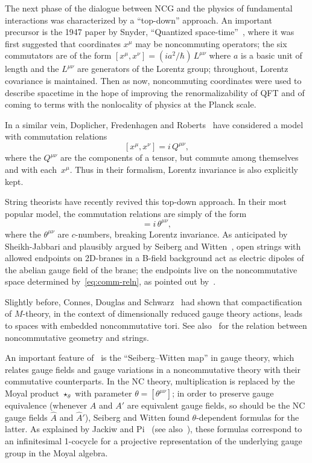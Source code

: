 \documentclass[a4paper,12pt]{article}
\makeatletter
\newcommand{\Ahat}{\Hat{A}}
\renewcommand{\Hat}[1]{\widehat{#1}}  %
\newcommand{\1}{\mathbf{1}}         %
\newcommand{\7}{\dagger}            %
\newcommand{\8}{\bullet}            %
\renewcommand{\.}{\cdot}            %
\renewcommand{\:}{\colon}           %
\def\section{\@startsection{section}{1}{\z@}{-3.5ex plus -1ex minus
 -.2ex}{2.3ex plus .2ex}{\large\bf}}
\makeatother
\begin{document}
\section{Noncommutative field theory}

The next phase of the dialogue between NCG and the physics of
fundamental interactions was characterized by a ``top-down'' approach.
An important precursor is the 1947 paper by Snyder, ``Quantized
space-time''~\cite{Snyder}, where it was first suggested that
coordinates $x^\mu$ may be noncommuting operators; the six commutators
are of the form $[x^\mu,x^\nu] = (ia^2/\hbar)\,L^{\mu\nu}$ where $a$
is a basic unit of length and the $L^{\mu\nu}$ are generators of the
Lorentz group; throughout, Lorentz covariance is maintained. Then as
now, noncommuting coordinates were used to describe spacetime in the
hope of improving the renormalizability of QFT and of coming to terms
with the nonlocality of physics at the Planck scale.

In a similar vein, Doplicher, Fredenhagen and
Roberts~\cite{DoplicherFR} have considered a model with commutation
relations
$$
[x^\mu, x^\nu] = i\, Q^{\mu\nu},
$$
where the $Q^{\mu\nu}$ are the components of a tensor, but commute
among themselves and with each~$x^\mu$. Thus in their formalism,
Lorentz invariance is also explicitly kept.

String theorists have recently revived this top-down approach. In
their most popular model, the commutation relations are simply of the
form
\begin{equation}
[x^\mu, x^\nu] = i\, \theta^{\mu\nu},
\label{eq:comm-reln}
\end{equation}
where the $\theta^{\mu\nu}$ are $c$-numbers, breaking Lorentz
invariance. As anticipated by Sheikh-Jabbari \cite{Jabbari} and
plausibly argued by Seiberg and Witten~\cite{SeibergWGeom}, open
strings with allowed endpoints on 2D-branes in a B-field background
act as electric dipoles of the abelian gauge field of the brane; the
endpoints live on the noncommutative space determined
by~\eqref{eq:comm-reln}, as pointed out by~\cite{Schomerus}.

Slightly before, Connes, Douglas and Schwarz~\cite{ConnesDS} had shown
that compactification of $M$-theory, in the context of dimensionally
reduced gauge theory actions, leads to spaces with embedded
noncommutative tori. See also~\cite{LandiLS} for the relation between
noncommutative geometry and strings.

An important feature of~\cite{SeibergWGeom} is the ``Seiberg--Witten
map'' in gauge theory, which relates gauge fields and gauge variations
in a noncommutative theory with their commutative counterparts. In the
NC theory, multiplication is replaced by the Moyal product
$\star_\theta$ with parameter $\theta = [\theta^{\mu\nu}]$; in order
to preserve gauge equivalence (whenever $A$ and $A'$ are equivalent
gauge fields, so should be the NC gauge fields $\Ahat$ and $\Ahat'$),
Seiberg and Witten found $\theta$-dependent formulas for the latter.
As explained by Jackiw and Pi~\cite{JackiwP} (see
also~\cite{JurcoSW}), these formulas correspond to an infinitesimal
1-cocycle for a projective representation of the underlying gauge
group in the Moyal algebra.
\end{document}
